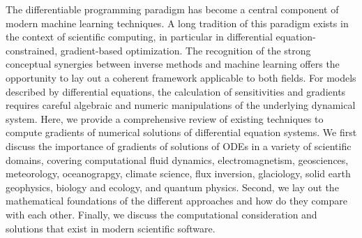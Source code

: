 The differentiable programming paradigm has become a central component of modern machine learning techniques. 
A long tradition of this paradigm exists in the context of scientific computing, in particular in differential equation-constrained, gradient-based optimization.
The recognition of the strong conceptual synergies between inverse methods and machine learning offers the opportunity to lay out a coherent framework applicable to both fields.
For models described by differential equations, the calculation of sensitivities and gradients requires careful algebraic and numeric manipulations of the underlying dynamical system.
Here, we provide a comprehensive review of existing techniques to compute gradients of numerical solutions of differential equation systems.
We first discuss the importance of gradients of solutions of ODEs in a variety of scientific domains, covering computational fluid dynamics, electromagnetism, geosciences, meteorology, oceanograpgy, climate science, flux inversion, glaciology, solid earth geophysics, biology and ecology, and quantum physics.
Second, we lay out the mathematical foundations of the different approaches and how do they compare with each other. 
Finally, we discuss the computational consideration and solutions that exist in modern scientific software. 